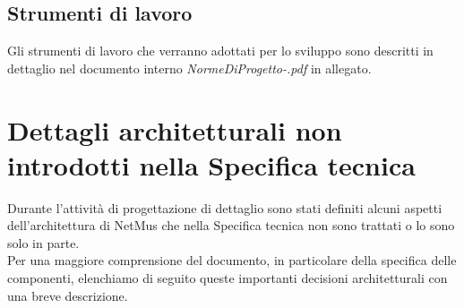 \section{Strumenti di lavoro}
Gli strumenti di lavoro che verranno adottati per lo sviluppo sono descritti in
dettaglio nel documento interno \emph{NormeDiProgetto-\versionenormeprogetto.pdf} in
allegato.


\chapter{Dettagli architetturali non introdotti nella Specifica tecnica}
\thispagestyle{fancy} %
Durante l'attivit\`a di progettazione di dettaglio sono stati definiti alcuni
aspetti dell'architettura di NetMus che nella Specifica tecnica non sono
trattati o lo sono solo in parte.\\ Per una maggiore comprensione del documento,
in particolare della specifica delle componenti, elenchiamo di seguito queste
importanti decisioni architetturali con una breve descrizione.
